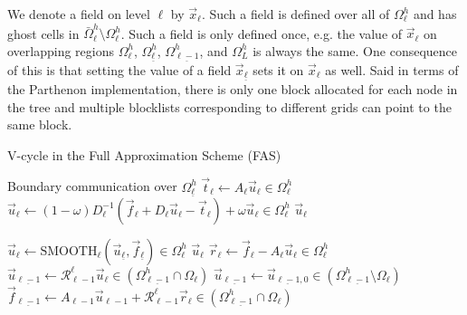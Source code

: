 \documentclass{article}
\begin{document}
We denote a field on level $\ell$ by $\vec{x}_\ell$. Such a field is defined over all of $\Omega^h_\ell$ and has ghost cells in $\bar \Omega^h_\ell \setminus \Omega^h_\ell$. Such a field is only defined once, e.g. the value of $\vec{x}_\ell$ on overlapping regions $\Omega^h_\ell$, $\Omega^h_\underline{\ell}$, $\Omega^h_\underline{\ell - 1}$, and $\Omega^h_L$ is always the same. One consequence of this is that setting the value of a field $\vec{x}_\underline{\ell}$ sets it on $\vec{x}_\ell$ as well. Said in terms of the Parthenon implementation, there is only one block allocated for each node in the tree and multiple blocklists corresponding to different grids can point to the same block. 

\begin{algorithm}

\caption{V-cycle in the Full Approximation Scheme (FAS)\label{alg:FAS}}
\begin{algorithmic}
 
    \State Boundary communication over $\Omega^h_{\underline \ell}$ 
    \State $\vec{t}_\ell \gets A_\ell \vec{u}_\ell \in \Omega^h_\ell$ 
    \State $\vec{u}_\ell \gets (1 - \omega) D_\ell^{-1} \left(\vec{f}_\ell + D_\ell \vec{u}_\ell - \vec{t}_\ell\right) + \omega \vec{u}_\ell \in \Omega^h_\ell$ 
    \State \Return $\vec{u}_\ell$ 
\EndProcedure
\end{algorithmic}
\begin{algorithmic}
    \State $\vec{u}_\ell \gets \text{SMOOTH}_\ell(\vec{u}_{\underline \ell}, \vec{f}_{\underline \ell}) \in \Omega^h_\ell$ 
      \State \Return $\vec{u}_\ell$
    \EndIf
    \State $\vec{r}_\ell \gets \vec{f}_\ell - A_\ell \vec{u}_\ell \in \Omega^h_\ell$
    \State $\vec{u}_{\underline{\ell-1}} \gets \mathcal{R}^\ell_{\ell - 1} \vec{u}_\ell \in (\Omega^h_{\underline{\ell - 1}} \cap \Omega_\ell)$
    \State $\vec{u}_{\underline{\ell-1}} \gets \vec{u}_{\underline{\ell - 1},0} \in (\Omega^h_{\underline{\ell - 1}} \setminus \Omega_\ell)$ 
    \State $\vec{f}_{\underline{\ell-1}} \gets A_{\ell - 1} \vec{u}_{\ell - 1} + \mathcal{R}^\ell_{\ell - 1} \vec{r}_\ell \in (\Omega^h_{\underline{\ell - 1}} \cap \Omega_\ell)$ 

\end{algorithmic}
\end{algorithm}
\end{document}
